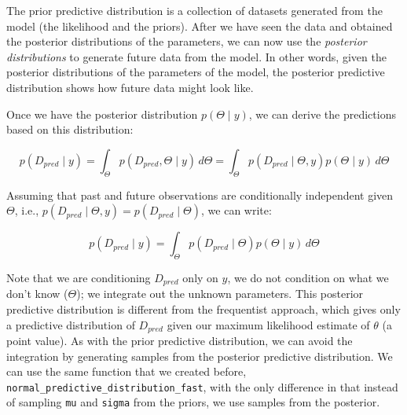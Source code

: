 \documentclass[12pt,]{krantz}
\newenvironment{Shaded}{\begin{snugshade}}{\end{snugshade}}
\newcommand{\DataTypeTok}[1]{\textcolor[rgb]{0.13,0.29,0.53}{#1}}
\newcommand{\KeywordTok}[1]{\textcolor[rgb]{0.13,0.29,0.53}{\textbf{#1}}}
\newcommand{\NormalTok}[1]{#1}
\newcommand{\OperatorTok}[1]{\textcolor[rgb]{0.81,0.36,0.00}{\textbf{#1}}}
\newcommand{\StringTok}[1]{\textcolor[rgb]{0.31,0.60,0.02}{#1}}
\theoremstyle{definition}
\theoremstyle{definition}
\theoremstyle{definition}
\theoremstyle{remark}
\begin{document}
The prior predictive distribution is a collection of datasets generated from the model (the likelihood and the priors). After we have seen the data and obtained the posterior distributions of the parameters, we can now use the \emph{posterior distributions} to generate future data from the model. In other words, given the posterior distributions of the parameters of the model, the posterior predictive distribution shows how future data might look like.

Once we have the posterior distribution \(p(\Theta\mid y)\), we can derive the predictions based on this distribution:

\begin{equation}
p(D_{pred}\mid y ) = \int_\Theta p(D_{pred}, \Theta\mid y)\, d\Theta= \int_\Theta 
p(D_{pred}\mid \Theta,y)p(\Theta\mid y)\, d\Theta
\end{equation}

Assuming that past and future observations are conditionally independent given \(\Theta\), i.e., \(p(D_{pred}\mid \Theta,y)= p(D_{pred}\mid \Theta)\), we can write:

\begin{equation}
p(D_{pred}\mid y )=\int_\Theta p(D_{pred}\mid \Theta) p(\Theta\mid y)\, d\Theta
\end{equation}

Note that we are conditioning \(D_{pred}\) only on \(y\), we do not condition on what we don't know (\(\Theta\)); we integrate out the unknown parameters. This posterior predictive distribution is different from the frequentist approach, which gives only a predictive distribution of \(D_{pred}\) given our maximum likelihood estimate of \(\theta\) (a point value). As with the prior predictive distribution, we can avoid the integration by generating samples from the posterior predictive distribution. We can use the same function that we created before, \texttt{normal\_predictive\_distribution\_fast}, with the only difference in that instead of sampling \texttt{mu} and \texttt{sigma} from the priors, we use samples from the posterior.

\begin{Shaded}
\end{Shaded}
\end{document}

